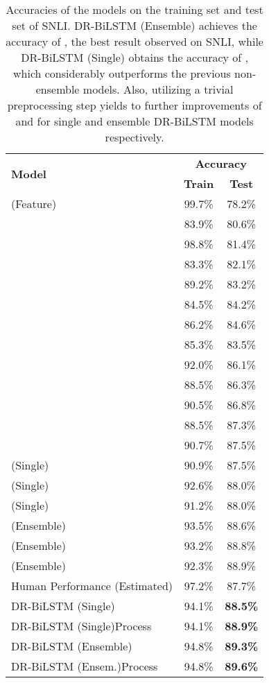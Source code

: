 \documentclass[11pt,a4paper]{article}
\begin{document}
	\begin{table}[ht]
		\begin{center}
			\small
			\begin{tabular}{lcc}
				\hline
				\multirow{2}{*}{\textbf{Model}}& \multicolumn{2}{c}{\bf{Accuracy}} \\ \cline{2-3}
				& \textbf{Train}&\textbf{Test}\\ 
				\hline \hline
				\cite{snli} (Feature)&99.7\%&78.2\%\\ 
				\hline \hline
				\cite{snli}&83.9\%&80.6\%\\ 
				\cite{Vendrov2015}&98.8\%&81.4\%\\
				\cite{Mou2016}&83.3\%&82.1\%\\
				\cite{Bowman2016}&89.2\%&83.2\%\\
				\cite{Liu2016}&84.5\%&84.2\%\\
				\cite{nse2017}&86.2\%&84.6\%\\ 
				\hline\hline
				\cite{Rocktaschel2015}&85.3\%&83.5\%\\
				\cite{Wang2016}&92.0\%&86.1\%\\
				\cite{fusion2016}&88.5\%&86.3\%\\
				\cite{google2016}&90.5\%&86.8\%\\
				\cite{nti2017}&88.5\%&87.3\%\\
				\cite{re-read}&90.7\%&87.5\%\\
				\cite{ibm2017} (Single)&90.9\%&87.5\%\\
				\cite{him2017} (Single)&92.6\%&88.0\% \\
				\cite{gong2017} (Single)&91.2\%&88.0\% \\
				\hline \hline
				\cite{him2017} (Ensemble)&93.5\%&88.6\%\\
				\cite{ibm2017} (Ensemble)&93.2\%&88.8\%\\
				\cite{gong2017} (Ensemble)&92.3\%&88.9\%\\
				\hline \hline
				Human Performance (Estimated)&97.2\%&87.7\%\\
				\hline\hline
				DR-BiLSTM (Single)&94.1\%&\textbf{88.5\%} \\
				DR-BiLSTM (Single)Process&94.1\%&\textbf{88.9\%} \\
				\hline
				DR-BiLSTM (Ensemble)&94.8\%&\textbf{89.3\%} \\
				DR-BiLSTM (Ensem.)Process&94.8\%&\textbf{89.6\%} \\
				\hline
			\end{tabular}
		\end{center}
		\caption{\label{tab:snli:result} Accuracies of the models on the training set and test set of SNLI. DR-BiLSTM (Ensemble) achieves the accuracy of , the best result observed on SNLI, while DR-BiLSTM (Single) obtains the accuracy of , which considerably outperforms the previous non-ensemble models. Also, utilizing a trivial preprocessing step yields to further improvements of  and  for single and ensemble DR-BiLSTM models respectively.}
	\end{table}
	
\end{document}
